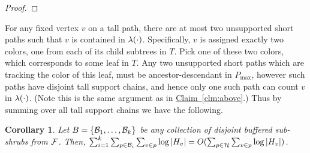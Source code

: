 \documentclass[11pt]{article}
\newtheorem{corollary}[theorem]{Corollary}
\theoremstyle{definition}
\newcommand{\cF}{{\cal F}}
\newcommand{\cH}{{\cal H}}
\newcommand{\Clm}[1]{\hyperref[clm:#1]{Claim~\ref*{clm:#1}}} %
\newcommand{\Cor}[1]{\hyperref[cor:#1]{Corollary~\ref*{cor:#1}}} %
\newcommand{\Def}[1]{\hyperref[def:#1]{Definition~\ref*{def:#1}}} %
\newcommand{\pmax}{P_{\max}}
\begin{document}
\begin{proof}
%  
%  
%  
%  
\end{proof}

For any fixed vertex $v$ on a tall path, there are at most two unsupported short paths such that $v$ is contained in $\lambda(\cdot)$. Specifically, 
$v$ is assigned exactly two colors, one from each of its child subtrees in $T$.  Pick one of these two colors, which corresponds to some leaf in $T$.  
Any two unsupported short paths which are tracking the color of this leaf, must be ancestor-descendant in $\pmax$, however such paths have disjoint tall support chains, 
and hence only one such path can count $v$ in $\lambda(\cdot)$.
(Note this is the same argument as in \Clm{above}.)  Thus by summing over all tall support chains we have the following.


\begin{corollary}\label{cor:disjointBuff}
 Let $B= \{\mathcal{B}_1, \ldots, \mathcal{B}_k\}$ be any collection of disjoint buffered sub-shrubs from $\cF$. Then, 
 $\sum_{i=1}^k \sum_{p\in \buff_i}\sum_{v\in p} \log |H_v| = O(\sum_{p\in \cH}\sum_{v\in p} \log |H_v| )$.
\end{corollary}
\end{document}
